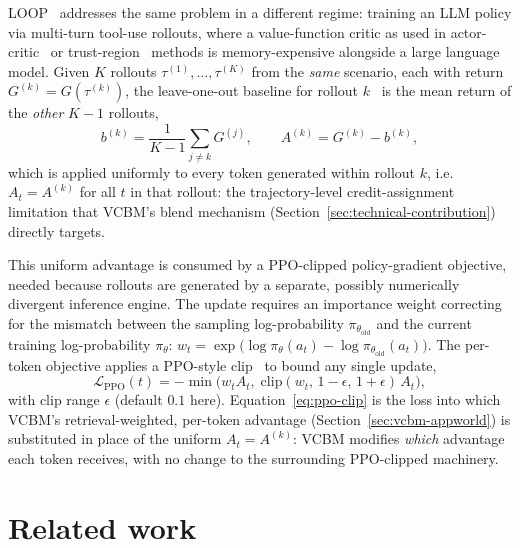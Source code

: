 LOOP~\cite{chen2025loop} addresses the same problem in a different regime: training an LLM policy via multi-turn tool-use rollouts, where a value-function critic as used in actor-critic~\cite{mnih2016a3c} or trust-region~\cite{schulman2015trpo} methods is memory-expensive alongside a large language model. Given $K$ rollouts $\tau^{(1)}, \dots, \tau^{(K)}$ from the \emph{same} scenario, each with return $G^{(k)} = G(\tau^{(k)})$, the leave-one-out baseline for rollout $k$~\cite{kool2019buy} is the mean return of the \emph{other} $K-1$ rollouts,
\begin{equation}
  b^{(k)} = \frac{1}{K-1}\sum_{j \neq k} G^{(j)}, \qquad A^{(k)} = G^{(k)} - b^{(k)} ,
  \label{eq:loo-advantage}
\end{equation}
which is applied uniformly to every token generated within rollout $k$, i.e.\ $A_t = A^{(k)}$ for all $t$ in that rollout: the trajectory-level credit-assignment limitation that VCBM's blend mechanism (Section~\ref{sec:technical-contribution}) directly targets.

This uniform advantage is consumed by a PPO-clipped policy-gradient objective, needed because rollouts are generated by a separate, possibly numerically divergent inference engine. The update requires an importance weight correcting for the mismatch between the sampling log-probability $\pi_{\theta_{\mathrm{old}}}$ and the current training log-probability $\pi_\theta$: $w_t = \exp\big(\log \pi_\theta(a_t) - \log \pi_{\theta_{\mathrm{old}}}(a_t)\big)$. The per-token objective applies a PPO-style clip~\cite{schulman2017ppo} to bound any single update,
\begin{equation}
  \mathcal{L}_{\mathrm{PPO}}(t) = -\min\Big(w_t A_t,\; \mathrm{clip}(w_t,\, 1-\epsilon,\, 1+\epsilon)\, A_t\Big) ,
  \label{eq:ppo-clip}
\end{equation}
with clip range $\epsilon$ (default $0.1$ here). Equation~\ref{eq:ppo-clip} is the loss into which VCBM's retrieval-weighted, per-token advantage (Section~\ref{sec:vcbm-appworld}) is substituted in place of the uniform $A_t = A^{(k)}$: VCBM modifies \emph{which} advantage each token receives, with no change to the surrounding PPO-clipped machinery.


\section{Related work}
\label{sec:related-work}

